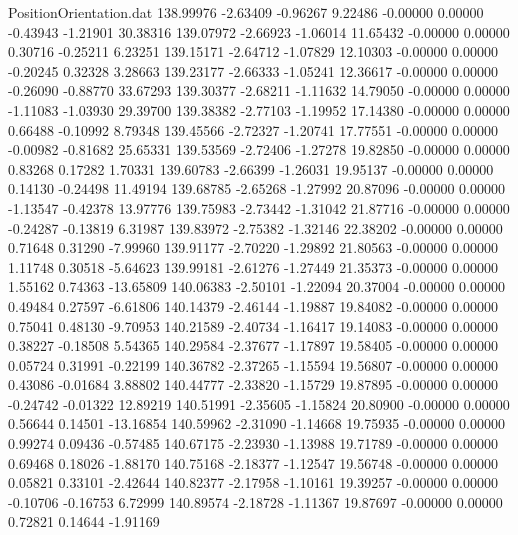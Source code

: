 \begin{filecontents}{PositionOrientation.dat}
 138.99976   -2.63409   -0.96267     9.22486   -0.00000    0.00000   -0.43943   -1.21901   30.38316
 139.07972   -2.66923   -1.06014    11.65432   -0.00000    0.00000    0.30716   -0.25211    6.23251
 139.15171   -2.64712   -1.07829    12.10303   -0.00000    0.00000   -0.20245    0.32328    3.28663
 139.23177   -2.66333   -1.05241    12.36617   -0.00000    0.00000   -0.26090   -0.88770   33.67293
 139.30377   -2.68211   -1.11632    14.79050   -0.00000    0.00000   -1.11083   -1.03930   29.39700
 139.38382   -2.77103   -1.19952    17.14380   -0.00000    0.00000    0.66488   -0.10992    8.79348
 139.45566   -2.72327   -1.20741    17.77551   -0.00000    0.00000   -0.00982   -0.81682   25.65331
 139.53569   -2.72406   -1.27278    19.82850   -0.00000    0.00000    0.83268    0.17282    1.70331
 139.60783   -2.66399   -1.26031    19.95137   -0.00000    0.00000    0.14130   -0.24498   11.49194
 139.68785   -2.65268   -1.27992    20.87096   -0.00000    0.00000   -1.13547   -0.42378   13.97776
 139.75983   -2.73442   -1.31042    21.87716   -0.00000    0.00000   -0.24287   -0.13819    6.31987
 139.83972   -2.75382   -1.32146    22.38202   -0.00000    0.00000    0.71648    0.31290   -7.99960
 139.91177   -2.70220   -1.29892    21.80563   -0.00000    0.00000    1.11748    0.30518   -5.64623
 139.99181   -2.61276   -1.27449    21.35373   -0.00000    0.00000    1.55162    0.74363  -13.65809
 140.06383   -2.50101   -1.22094    20.37004   -0.00000    0.00000    0.49484    0.27597   -6.61806
 140.14379   -2.46144   -1.19887    19.84082   -0.00000    0.00000    0.75041    0.48130   -9.70953
 140.21589   -2.40734   -1.16417    19.14083   -0.00000    0.00000    0.38227   -0.18508    5.54365
 140.29584   -2.37677   -1.17897    19.58405   -0.00000    0.00000    0.05724    0.31991   -0.22199
 140.36782   -2.37265   -1.15594    19.56807   -0.00000    0.00000    0.43086   -0.01684    3.88802
 140.44777   -2.33820   -1.15729    19.87895   -0.00000    0.00000   -0.24742   -0.01322   12.89219
 140.51991   -2.35605   -1.15824    20.80900   -0.00000    0.00000    0.56644    0.14501  -13.16854
 140.59962   -2.31090   -1.14668    19.75935   -0.00000    0.00000    0.99274    0.09436   -0.57485
 140.67175   -2.23930   -1.13988    19.71789   -0.00000    0.00000    0.69468    0.18026   -1.88170
 140.75168   -2.18377   -1.12547    19.56748   -0.00000    0.00000    0.05821    0.33101   -2.42644
 140.82377   -2.17958   -1.10161    19.39257   -0.00000    0.00000   -0.10706   -0.16753    6.72999
 140.89574   -2.18728   -1.11367    19.87697   -0.00000    0.00000    0.72821    0.14644   -1.91169

\end{filecontents}
